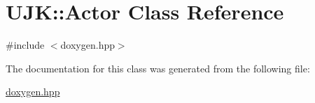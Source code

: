 \hypertarget{class_u_j_k_1_1_actor}{}\section{U\+JK\+::Actor Class Reference}
\label{class_u_j_k_1_1_actor}


{\ttfamily \#include $<$doxygen.\+hpp$>$}



The documentation for this class was generated from the following file\+:\begin{DoxyCompactItemize}
\item 
\mbox{\hyperlink{doxygen_8hpp}{doxygen.\+hpp}}\end{DoxyCompactItemize}
